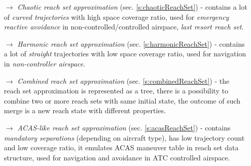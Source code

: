 \begin{itemize}
    \item[$\to$] \emph{Chaotic reach set approximation} (sec. \ref{s:chaoticReachSet}) - contains a lot of \emph{curved trajectories} with high space coverage ratio, used for \emph{emergency reactive avoidance} in non-controlled/controlled airspace, \emph{last resort reach set}.
    
    \item[$\to$] \emph{Harmonic reach set approximation} (sec. \ref{s:harmonicReachSet}) -  contains a lot of \emph{straight} trajectories with low space coverage ratio, used for navigation in \emph{non-controller airspace}.
    
    \item[$\to$] \emph{Combined reach set approximation} (sec. \ref{s:combinedReachSet}) - the reach set approximation is represented as a tree, there is a possibility to combine two or more reach sets with same initial state, the outcome of such merge is a new reach state with different properties.
    
    \item[$\to$] \emph{ACAS-like reach set approximation} (sec. \ref{s:acasReachSet}) - contains \emph{mandatory separations} (depending on aircraft type), has low trajectory count and low coverage ratio, it emulates ACAS maneuver table in reach set data structure, used for navigation and avoidance in ATC controlled airspace.
\end{itemize}